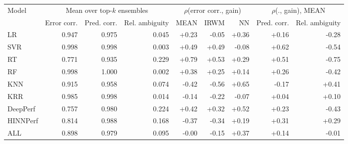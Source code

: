 \begin{tabular}{lrrrrrrrr}
\toprule
Model & \multicolumn{3}{c}{Mean over top-$k$ ensembles} & \multicolumn{3}{c}{$\rho$(error corr., gain)} & \multicolumn{2}{c}{$\rho$(., gain), MEAN} \\
 & Error corr. & Pred. corr. & Rel. ambiguity & MEAN & IRWM & NN & Pred. corr. & Rel. ambiguity \\
\midrule
LR & 0.947 & 0.975 & 0.045 & +0.23 & -0.05 & +0.36 & +0.16 & -0.28 \\
SVR & 0.998 & 0.998 & 0.003 & +0.49 & +0.49 & -0.08 & +0.62 & -0.54 \\
RT & 0.771 & 0.935 & 0.229 & +0.79 & +0.53 & +0.29 & +0.51 & -0.75 \\
RF & 0.998 & 1.000 & 0.002 & +0.38 & +0.25 & +0.14 & +0.26 & -0.42 \\
KNN & 0.915 & 0.958 & 0.074 & -0.42 & -0.56 & +0.65 & -0.17 & +0.41 \\
KRR & 0.985 & 0.998 & 0.014 & -0.14 & -0.22 & -0.07 & +0.04 & +0.10 \\
DeepPerf & 0.757 & 0.980 & 0.224 & +0.42 & +0.32 & +0.52 & +0.23 & -0.43 \\
HINNPerf & 0.814 & 0.988 & 0.168 & -0.37 & -0.34 & +0.19 & +0.31 & +0.29 \\
ALL & 0.898 & 0.979 & 0.095 & -0.00 & -0.15 & +0.37 & +0.14 & -0.01 \\
\bottomrule
\end{tabular}
